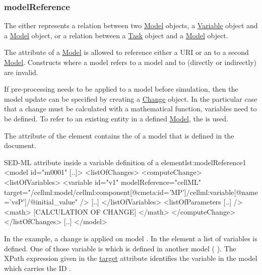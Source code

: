 \subsubsection{modelReference}
\label{sec:modelReference}
%
The  either represents a relation between two \hyperref[class:model]{Model} objects, a \hyperref[class:variable]{Variable} object and a \hyperref[class:Model]{Model} object, or  a relation between a \hyperref[class:task]{Task} object and a \hyperref[class:Model]{Model} object.

The  attribute of a \hyperref[class:model]{Model} is allowed to reference either a URI or an  to a second
\hyperref[class:model]{Model}. Constructs where a model  refers to a model  and  to  (directly or indirectly) are invalid.

If pre-processing needs to be applied to a model before simulation, then the model update can be specified by creating a \hyperref[class:Change]{Change} object. In the particular case that a change must be calculated with a mathematical function, variables need to be defined. To refer to an existing entity in a defined \hyperref[class:model]{Model}, the  is used. 

The  attribute of the  element contains the  of a model that is defined in the document. 
%
\begin{myXmlLst}{SED-ML  attribute inside a variable definition of a   element}{lst:modelReference1}
<model id="m0001" [..]>
 <listOfChanges>
   <computeChange>
    <listOfVariables>
     <variable id="v1" modelReference="cellML" target="/cellml:model/cellml:component[@cmeta:id='MP']/cellml:variable[@name='vsP']/@initial_value" />
     [..]
    </listOfVariables>
    <listOfParameters [..] />
    <math>
     [CALCULATION OF CHANGE]
    </math>
   </computeChange>
 </listOfChanges>
 [..]
</model>
\end{myXmlLst}
%
In the example, a change is  applied on model . In the  element a list of variables is defined. One of those variable is  which is defined in another model ( ). 
The XPath expression given in the \hyperref[sec:target]{target} attribute identifies the variable in the model which carries the ID .

